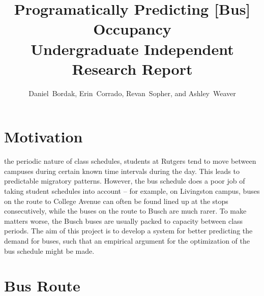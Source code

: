 \documentclass[12pt,journal,compsoc]{IEEEtran} %
\begin{document}
\title{Programatically Predicting [Bus] Occupancy\\
{\large Undergraduate Independent Research Report}}
\author{Daniel~Bordak, Erin~Corrado, Revan~Sopher, and Ashley~Weaver}


\maketitle


\section{Motivation}

 the periodic nature of class schedules, students at Rutgers tend to move between campuses during certain known time intervals during the day.
This leads to predictable migratory patterns.
However, the bus schedule does a poor job of taking student schedules into account -- for example, on Livingston campus, buses on the route to College Avenue can often be found lined up at the stops consecutively, while the buses on the route to Busch are much rarer.
To make matters worse, the Busch buses are usually packed to capacity between class periods.
The aim of this project is to develop a system for better predicting the demand for buses, such that an empirical argument for the optimization of the bus schedule might be made.



\section{Bus Route}
\end{document}
